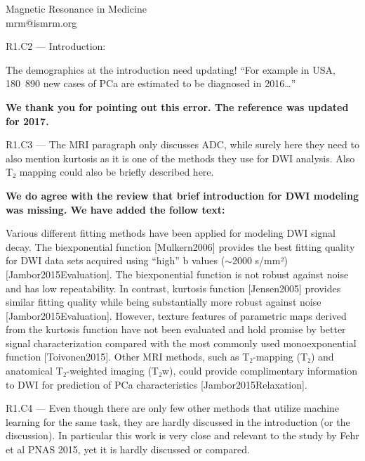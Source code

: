 \documentclass{letter}
\newenvironment{comment}[1]%
  {\vspace{5ex}\par\textsf{#1 ---} \ignorespaces}%
  {\par\ignorespacesafterend}
\newenvironment{reply}%
  {\vspace{2ex}\par\bfseries}%
  {\par\upshape}
\providecommand{\citep}[1]{[#1]}
\begin{document}
\begin{letter}{Magnetic Resonance in Medicine \\ mrm@ismrm.org}
\begin{comment}{R1.C2}
Introduction:

The demographics at the introduction need updating! “For example in USA, 180~890
new cases of PCa are estimated to be diagnosed in 2016…”
\end{comment}

\begin{reply}
We thank you for pointing out this error. The reference was updated for 2017.
\end{reply}


\begin{comment}{R1.C3}
The MRI paragraph only discusses ADC, while surely here they need to also
mention kurtosis as it is one of the methods they use for DWI analysis. Also T₂
mapping could also be briefly described here.
\end{comment}

\begin{reply}
We do agree with the review that brief introduction for DWI modeling was
missing. We have added the follow text:

Various different fitting methods have been applied for modeling DWI signal
decay. The biexponential function \citep{Mulkern2006} provides the best fitting
quality for DWI data sets acquired using ``high'' b values ($\sim$2000 s/mm²)
\citep{Jambor2015Evaluation}. The biexponential function is not robust against
noise and has low repeatability. In contrast, kurtosis function
\citep{Jensen2005} provides similar fitting quality while being substantially
more robust against noise \citep{Jambor2015Evaluation}. However, texture
features of parametric maps derived from the kurtosis function have not been
evaluated and hold promise by better signal characterization compared with the
most commonly used monoexponential function \citep{Toivonen2015}. Other MRI
methods, such as T₂-mapping (T₂) and anatomical T₂-weighted imaging (T₂w), could
provide complimentary information to DWI for prediction of PCa characteristics
\citep{Jambor2015Relaxation}.
\end{reply}


\begin{comment}{R1.C4}
Even though there are only few other methods that utilize machine learning for
the same task, they are hardly discussed in the introduction (or the
discussion). In particular this work is very close and relevant to the study by
Fehr et al PNAS 2015, yet it is hardly discussed or compared.
\end{comment}


\end{letter}
\end{document}
